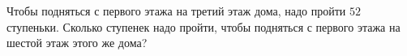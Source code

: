 \begin{ex}
	\begin{condition}
		Чтобы подняться с первого этажа на третий этаж дома, надо пройти \( 52 \) ступеньки.
		Сколько ступенек надо пройти, чтобы подняться с первого этажа на шестой этаж
		этого же дома?
	\end{condition}
\end{ex}